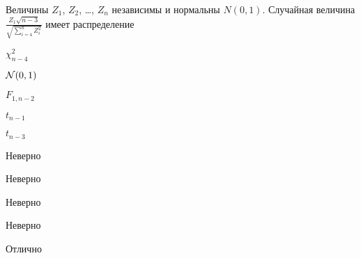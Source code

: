 
\begin{question}
Величины \(Z_1\), \(Z_2\), \ldots, \(Z_n\) независимы и нормальны
\(N(0,1)\). Случайная величина
\(\frac{Z_1\sqrt{n-3}}{\sqrt{\sum_{i=4}^n Z_i^2}}\) имеет распределение
\begin{answerlist}
  \item \(\chi^2_{n-4}\)
  \item \(\mathcal{N}(0,1)\)
  \item \(F_{1,n-2}\)
  \item \(t_{n-1}\)
  \item \(t_{n-3}\)
\end{answerlist}
\end{question}

\begin{solution}
\begin{answerlist}
  \item Неверно
  \item Неверно
  \item Неверно
  \item Неверно
  \item Отлично
\end{answerlist}
\end{solution}

